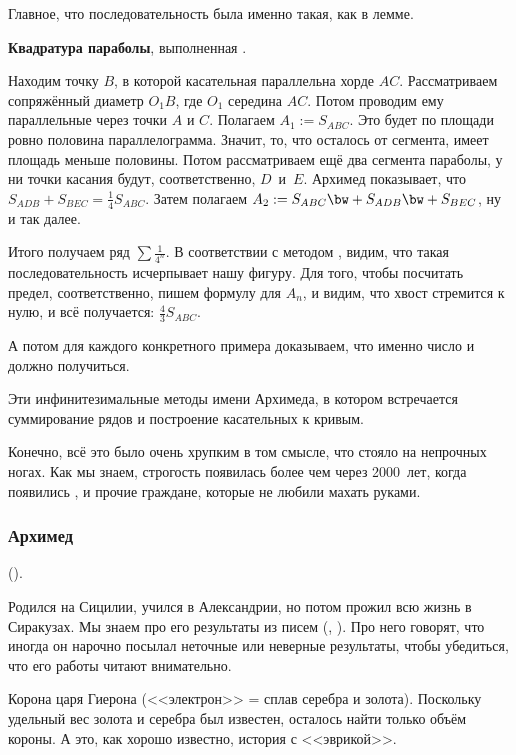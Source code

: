 \documentclass[a4paper,oneside,fleqn,10pt]{article}
\begin{document}
Главное, что последовательность была именно такая, как в лемме.

\textbf{Квадратура параболы}, выполненная .

Находим точку $B$, в которой касательная параллельна хорде $AC$.
Рассматриваем сопряжённый диаметр $O_1B$, где $O_1$ середина $AC$. Потом проводим ему параллельные
через точки $A$ и $C$. Полагаем $A_1 := S_{ABC}$. Это будет по площади
ровно половина параллелограмма. Значит, то, что осталось от сегмента, имеет
площадь меньше половины. Потом рассматриваем ещё два сегмента параболы,
у ни точки касания будут, соответственно, $D$~и~$E$. Архимед показывает,
что  $S_{ADB} + S_{BEC} = \frac14 S_{ABC}$.
Затем полагаем $A_2 := S_{ABC} \bw+ S_{ADB} \bw+ S_{BEC}$, ну и так далее.


Итого получаем ряд $\sum\frac{1}{4^n}$. В соответствии с методом , видим,
что такая последовательность исчерпывает нашу фигуру. Для того, чтобы посчитать предел,
соответственно, пишем формулу для $A_n$, и видим, что хвост стремится к нулю,
и всё получается: $\frac43S_{ABC}$.

А потом для каждого конкретного примера доказываем, что именно число и должно получиться.

Эти инфинитезимальные методы имени Архимеда, в котором встречается суммирование рядов
и построение касательных к кривым.

Конечно, всё это было очень хрупким в том смысле, что стояло на непрочных ногах.
Как мы знаем, строгость появилась более чем через 2000~лет, когда появились ,
 и прочие граждане, которые не любили махать руками.

\subsubsection{Архимед}

 ().

Родился на Сицилии, учился в Александрии, но потом прожил всю жизнь в Сиракузах.
Мы знаем про его результаты из писем (, ). Про него говорят, что иногда
он нарочно посылал неточные или неверные результаты, чтобы убедиться, что его работы
читают внимательно.

Корона царя Гиерона (<<электрон>> = сплав серебра и золота). Поскольку удельный вес золота и серебра
был известен, осталось найти только объём короны. А это, как хорошо известно, история с <<эврикой>>.
\end{document}
